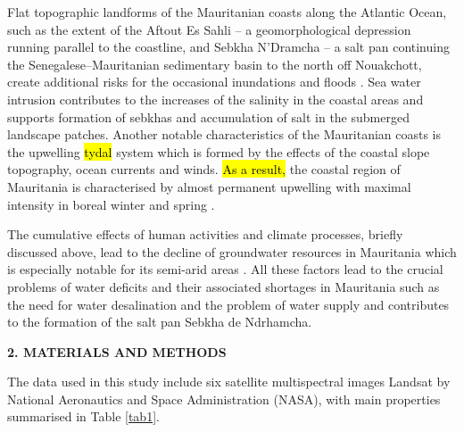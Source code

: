 \documentclass[12pt,a4paper,oneside]{article}
\def \newsection{\vspace{12pt}\textbf}
\def \newpar{\vspace{6pt}}
\begin{document}
\newpar Flat topographic landforms of the Mauritanian coasts along the Atlantic Ocean, such as the extent of the Aftout Es Sahli -- a geomorphological depression running parallel to the coastline, and Sebkha N'Dramcha -- a salt pan continuing the Senegalese–Mauritanian sedimentary basin to the north off Nouakchott, create additional risks for the occasional inundations and floods \citep{Vermeer2010}. Sea water intrusion contributes to the increases of the salinity in the coastal areas and supports formation of sebkhas and accumulation of salt in the submerged landscape patches. Another notable characteristics of the Mauritanian coasts is the upwelling \hl{tydal} system which is formed by the effects of the coastal slope topography, ocean currents and winds. \hl{As a result, }the coastal region of\hl{ }Mauritania is characterised by almost permanent upwelling with maximal intensity in boreal winter and spring \citep{Versteegh}.

\newpar The cumulative effects of human activities and climate processes, briefly discussed above, lead to the decline of groundwater resources in Mauritania which is especially notable for its semi-arid areas   \citep{MOHAMED2017280}. All these factors lead to the crucial problems of water deficits and their associated shortages in Mauritania such as the need for water desalination and the problem of water supply \citep{BAYODRUJULA201099} and contributes to the formation of the salt pan Sebkha de Ndrhamcha. 

\newsection {2. MATERIALS AND METHODS}

\newpar The data used in this study include six satellite multispectral images Landsat by National Aeronautics and Space Administration (NASA), with main properties summarised in Table \ref{tab1}. 
\end{document}
